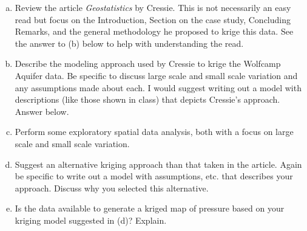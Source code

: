 \documentclass[letterpaper, 12pt]{article}
\begin{document}
\begin{enumerate}[a.]
\item
Review the article \textit{Geostatistics} by Cressie. This is not necessarily an easy read but focus on the Introduction, Section on the case study, Concluding Remarks, and the general methodology he proposed to krige this data. See the answer to (b) below to help with understanding the read.

\item
Describe the modeling approach used by Cressie to krige the Wolfcamp Aquifer data. Be specific to discuss large scale and small scale variation and any assumptions made about each. I would suggest writing out a model with descriptions (like those shown in class) that depicts Cressie’s approach. Answer below.

\item
Perform some exploratory spatial data analysis, both with a focus on large scale and small scale variation.

\item
Suggest an alternative kriging approach than that taken in the article. Again be specific to write out a model with assumptions, etc. that describes your approach. Discuss why you selected this alternative.

\item
Is the data available to generate a kriged map of pressure based on your kriging model suggested in (d)? Explain.

\end{enumerate}
\end{document}
